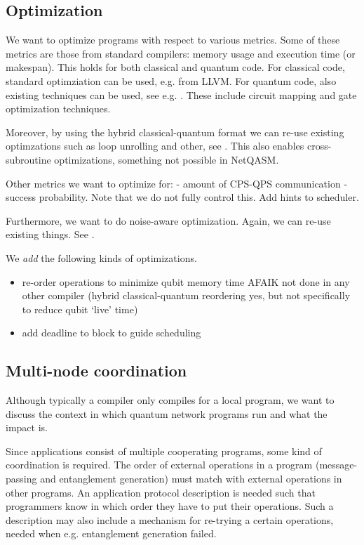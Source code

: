 \subsection{Optimization}
We want to optimize programs with respect to various metrics.
Some of these metrics are those from standard compilers: memory usage and execution time (or makespan).
This holds for both classical and quantum code.
For classical code, standard optimziation can be used, e.g. from LLVM.
For quantum code, also existing techniques can be used, see e.g. .
These include circuit mapping and gate optimization techniques.

Moreover, by using the hybrid classical-quantum format we can re-use existing optimzations such as loop unrolling and other, see .
This also enables cross-subroutine optimizations, something not possible in NetQASM.

Other metrics we want to optimize for:
- amount of CPS-QPS communication
- success probability. Note that we do not fully control this. Add hints to scheduler.

Furthermore, we want to do noise-aware optimization.
Again, we can re-use existing things. See \cite{smith_error_2021, murali_noise-adaptive_2019}.

We \textit{add} the following kinds of optimizations.
\begin{itemize}
  \item re-order operations to minimize qubit memory time
    AFAIK not done in any other compiler (hybrid classical-quantum reordering yes, but not specifically to reduce qubit `live' time)
  \item add deadline to block to guide scheduling
\end{itemize}




\subsection{Multi-node coordination}
Although typically a compiler only compiles for a local program, we want to discuss the context in which quantum network programs run and what the impact is.

Since applications consist of multiple cooperating programs, some kind of coordination is required.
The order of external operations in a program (message-passing and entanglement generation) must match with external operations in other programs.
An application protocol description is needed such that programmers know in which order they have to put their operations.
Such a description may also include a mechanism for re-trying a certain operations, needed when e.g. entanglement generation failed.

